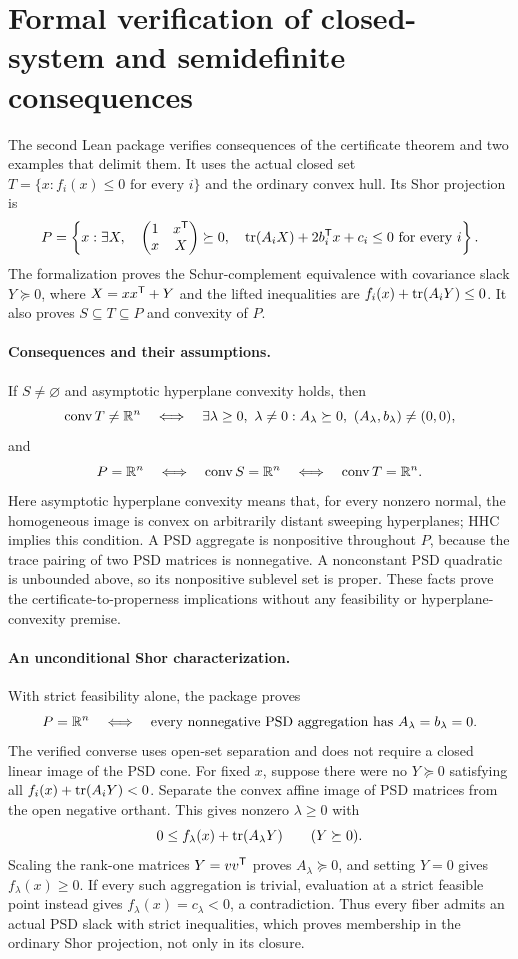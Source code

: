 \section{Formal verification of closed-system and semidefinite consequences}
\label{sec:formal-consequences}

The second Lean package verifies consequences of the certificate theorem
and two examples that delimit them. It uses the actual closed
set $T=\{x:f_i(x)\leq0\text{ for every }i\}$ and the ordinary convex hull.
Its Shor projection is
\[
 P=\left\{x:\exists X,\quad
 \begin{pmatrix}1&x^{\mathsf T}\\x&X\end{pmatrix}\succeq0,
 \quad \operatorname{tr}(A_iX)+2b_i^{\mathsf T} x+c_i\leq0\text{ for every }i\right\}.
\]
The formalization proves the Schur-complement equivalence with covariance
slack $Y\succeq0$, where $X=xx^{\mathsf T}+Y$ and the lifted inequalities
are $f_i(x)+\operatorname{tr}(A_iY)\leq0$. It also proves $S\subseteq T\subseteq P$
and convexity of $P$.

\paragraph{Consequences and their assumptions.}
If $S\ne\varnothing$ and asymptotic hyperplane convexity holds, then
\[
 \operatorname{conv} T\ne\mathbb R^n
 \quad\Longleftrightarrow\quad
 \exists\lambda\geq0,\ \lambda\ne0:
 A_\lambda\succeq0,\ (A_\lambda,b_\lambda)\ne(0,0),
\]
and
\[
 P=\mathbb R^n\quad\Longleftrightarrow\quad
 \operatorname{conv} S=\mathbb R^n\quad\Longleftrightarrow\quad\operatorname{conv} T=\mathbb R^n.
\]
Here asymptotic hyperplane convexity means that, for every nonzero normal,
the homogeneous image is convex on arbitrarily distant sweeping hyperplanes;
HHC implies this condition. A PSD aggregate is nonpositive throughout $P$,
because the trace pairing of two PSD matrices is nonnegative. A nonconstant
PSD quadratic is unbounded above, so its nonpositive sublevel set is proper.
These facts prove the certificate-to-properness implications without any
feasibility or hyperplane-convexity premise.

\paragraph{An unconditional Shor characterization.}
With strict feasibility alone, the package proves
\[
 P=\mathbb R^n
 \quad\Longleftrightarrow\quad
 \text{every nonnegative PSD aggregation has }A_\lambda=b_\lambda=0.
\]
The verified converse uses open-set separation and does not require a
closed linear image of the PSD cone. For fixed $x$, suppose there were no
$Y\succeq0$ satisfying all $f_i(x)+\operatorname{tr}(A_iY)<0$. Separate the convex affine
image of PSD matrices from the open negative orthant. This gives nonzero
$\lambda\geq0$ with
\[
 0\leq f_\lambda(x)+\operatorname{tr}(A_\lambda Y)\qquad(Y\succeq0).
\]
Scaling the rank-one matrices $Y=vv^{\mathsf T}$ proves $A_\lambda\succeq0$,
and setting $Y=0$ gives $f_\lambda(x)\geq0$. If every such aggregation is
trivial, evaluation at a strict feasible point instead gives
$f_\lambda(x)=c_\lambda<0$, a contradiction. Thus every fiber admits an
actual PSD slack with strict inequalities, which proves membership in the
ordinary Shor projection, not only in its closure.

